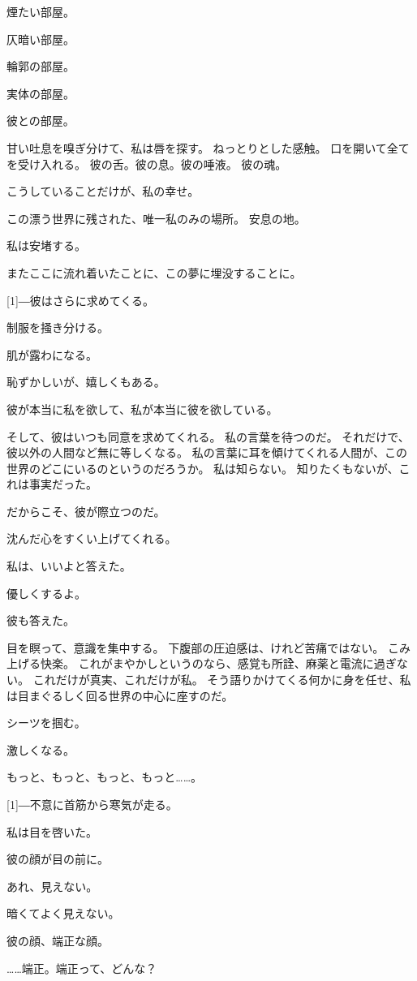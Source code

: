 \documentclass[../IHMain]{subfiles}
\begin{document}
煙たい部屋。

仄暗い部屋。

輪郭の部屋。

実体の部屋。

彼との部屋。

甘い吐息を嗅ぎ分けて、私は唇を探す。
ねっとりとした感触。
口を開いて全てを受け入れる。
彼の舌。彼の息。彼の唾液。
彼の魂。

こうしていることだけが、私の幸せ。

この漂う世界に残された、唯一私のみの場所。
安息の地。

私は安堵する。

またここに流れ着いたことに、この夢に埋没することに。

\scalebox{3}[1]{―}彼はさらに求めてくる。

制服を掻き分ける。

肌が露わになる。

恥ずかしいが、嬉しくもある。

彼が本当に私を欲して、私が本当に彼を欲している。

そして、彼はいつも同意を求めてくれる。
私の言葉を待つのだ。
それだけで、彼以外の人間など無に等しくなる。
私の言葉に耳を傾けてくれる人間が、この世界のどこにいるのというのだろうか。
私は知らない。
知りたくもないが、これは事実だった。

だからこそ、彼が際立つのだ。

沈んだ心をすくい上げてくれる。

私は、いいよと答えた。

優しくするよ。

彼も答えた。

目を瞑って、意識を集中する。
下腹部の圧迫感は、けれど苦痛ではない。
こみ上げる快楽。
これがまやかしというのなら、感覚も所詮、麻薬と電流に過ぎない。
これだけが真実、これだけが私。
そう語りかけてくる何かに身を任せ、私は目まぐるしく回る世界の中心に座すのだ。

シーツを掴む。

激しくなる。

もっと、もっと、もっと、もっと……。

\scalebox{3}[1]{―}不意に首筋から寒気が走る。

私は目を啓いた。

彼の顔が目の前に。

あれ、見えない。

暗くてよく見えない。

彼の顔、端正な顔。

……端正。端正って、どんな？
\end{document}
